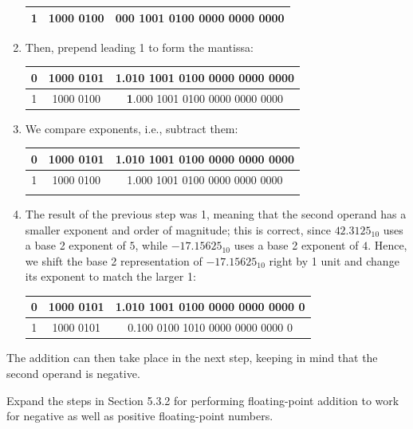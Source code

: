 \documentclass[12pt]{article}
\newenvironment{ex}[2][Exercise]{\begin{trivlist}
		\item[\hskip \labelsep {\bfseries #1}\hskip \labelsep {\bfseries #2.}]}{\end{trivlist}}
\newenvironment{sol}[1][Solution]{\begin{trivlist}
		\item[\hskip \labelsep {\bfseries #1:}]}{\end{trivlist}}
\begin{document}
\begin{sol}
\begin{enumerate}
\begin{center}
\begin{tabular}{|c|c|c|}
				\hline
				1 & 1000 0100 & 000 1001 0100 0000 0000 0000\\
				\hline
			\end{tabular}
		\end{center}
		\item Then, prepend leading 1 to form the mantissa:
		\begin{center}
			\begin{tabular}{|c|c|c|}
				\hline
				0 & 1000 0101 & \textbf{1}.010 1001 0100 0000 0000 0000\\
				\hline
				1 & 1000 0100 & \textbf{1}.000 1001 0100 0000 0000 0000\\
				\hline
			\end{tabular}
		\end{center}
		\item We compare exponents, i.e., subtract them:
		\begin{center}
			\begin{tabular}{|c|c|c|}
				\hline
				0 & 1000 0101 & 1.010 1001 0100 0000 0000 0000\\
				\hline
				1 & 1000 0100 & 1.000 1001 0100 0000 0000 0000\\
				\hline
				{} & \text{1}
			\end{tabular}
		\end{center}
		\item The result of the previous step was 1, meaning that the second operand has a smaller
		exponent and order of magnitude; this is correct, since $42.3125_{10}$ uses
		a base 2 exponent of $5$, while $-17.15625_{10}$ uses a base 2 exponent of
		$4$. Hence, we shift the base 2 representation of $-17.15625_{10}$ right
		by 1 unit and change its exponent to match the larger 1:
		\begin{center}
			\begin{tabular}{|c|c|c|}
				\hline
				0 & 1000 0101 & 1.010 1001 0100 0000 0000 0000 0\\
				\hline
				1 & 1000 0101 & 0.100 0100 1010 0000 0000 0000 0\\
			\end{tabular}
		\end{center}
	\end{enumerate}
	The addition can then take place in the next step, keeping in mind that the second
	operand is negative.
\end{sol}

\begin{ex}{5.44}
	Expand the steps in Section 5.3.2 for performing floating-point addition to work
	for negative as well as positive floating-point numbers.
\end{ex}
\end{document}

